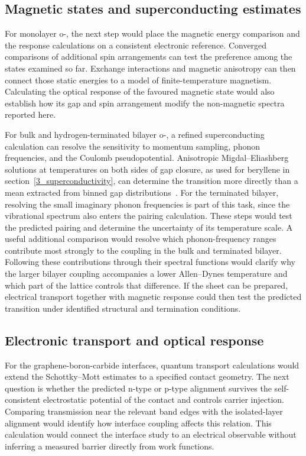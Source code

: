 \FloatBarrier
\subsection{Magnetic states and superconducting estimates}

For monolayer o-, the next step would place the magnetic energy comparison and the response calculations on a consistent electronic reference.
Converged comparisons of additional spin arrangements can test the preference among the states examined so far.
Exchange interactions and magnetic anisotropy can then connect those static energies to a model of finite-temperature magnetism.
Calculating the optical response of the favoured magnetic state would also establish how its gap and spin arrangement modify the non-magnetic spectra reported here.

For bulk and hydrogen-terminated bilayer o-, a refined superconducting calculation can resolve the sensitivity to momentum sampling, phonon frequencies, and the Coulomb pseudopotential.
Anisotropic Migdal--Eliashberg solutions at temperatures on both sides of gap closure, as used for beryllene in section~\ref{3_superconductivity}, can determine the transition more directly than a mean extracted from binned gap distributions~\cite{margine2013anisotropic}.
For the terminated bilayer, resolving the small imaginary phonon frequencies is part of this task, since the vibrational spectrum also enters the pairing calculation.
These steps would test the predicted pairing and determine the uncertainty of its temperature scale.
A useful additional comparison would resolve which phonon-frequency ranges contribute most strongly to the coupling in the bulk and terminated bilayer.
Following these contributions through their spectral functions would clarify why the larger bilayer coupling accompanies a lower Allen--Dynes temperature and which part of the lattice controls that difference.
If the sheet can be prepared, electrical transport together with magnetic response could then test the predicted transition under identified structural and termination conditions.

\FloatBarrier
\subsection{Electronic transport and optical response}

For the graphene-boron-carbide interfaces, quantum transport calculations would extend the Schottky--Mott estimates to a specified contact geometry.
The next question is whether the predicted n-type or p-type alignment survives the self-consistent electrostatic potential of the contact and controls carrier injection.
Comparing transmission near the relevant band edges with the isolated-layer alignment would identify how interface coupling affects this relation.
This calculation would connect the interface study to an electrical observable without inferring a measured barrier directly from work functions.


